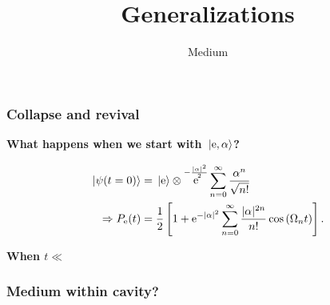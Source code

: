 \documentclass[t]{beamer}
\DeclareMathOperator{\ee}{e}
\begin{document}
\begin{frame}
\frametitle{Collapse and revival}

\textbf{What happens when we start with $\ket*{\text{e}, \alpha}$?}    

\[
    \begin{aligned}
        \ket*{\psi(t=0)} &= \ket*{\text{e}} \otimes \ee^{- \frac{\abs*{\alpha}^2}{2}} \sum_{n=0}^{\infty} \frac{\alpha^n}{\sqrt{n!}} \\
        \Rightarrow P_\text{e}(t) &= \frac{1}{2}\left[1+\mathrm{e}^{-|\alpha|^2} \sum_{n=0}^{\infty} \frac{|\alpha|^{2 n}}{n !} \cos \left(\Omega_n t\right)\right] . 
    \end{aligned}
\]

\textbf{When $t \ll $}

\end{frame}

\title{Generalizations}
\subtitle{Medium}
\author{}
\date{}

\begin{frame}
    \titlepage
\end{frame}

\begin{frame}
\frametitle{Medium within cavity?}

    

\end{frame}
\end{document}
